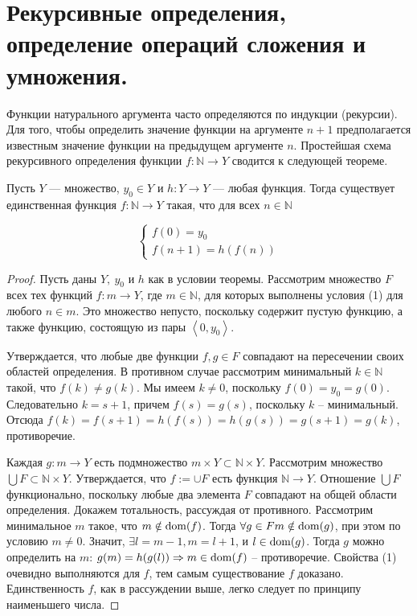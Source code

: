 \section{Рекурсивные определения, определение операций сложения и умножения.}

Функции натурального аргумента часто определяются по индукции (рекурсии). Для того, чтобы определить значение
функции на аргументе $n+1$ предполагается известным значение функции на предыдущем аргументе $n$. Простейшая схема
рекурсивного определения функции $f: \mathbb{N} \rightarrow Y$ сводится к следующей теореме. 

\begin{theorem}
	Пусть $Y$ — множество, $y_{0} \in Y$ и $h: Y \rightarrow Y$ — любая
	функция. Тогда существует единственная функция $f: \mathbb{N} \rightarrow Y$ такая,
	что для всех $n \in \mathbb{N}$

	\begin{equation}
		\left\{\begin{array}{l}
			{f(0)=y_{0}} \\
			{f(n+1)=h(f(n))}
		\end{array}\right.
	\end{equation}

\end{theorem}

\begin{proof}

	Пусть даны $Y, \ y_0$ и $h$ как в условии теоремы. Рассмотрим множество $F$ всех тех функций $f: m \rightarrow Y$,
	где $m \in \mathbb{N}$, для которых выполнены условия (1) для любого $n \in m$. Это множество непусто,
	поскольку содержит пустую функцию, а также функцию, состоящую из
	пары $\left\langle 0, y_{0}\right\rangle$.

	Утверждается, что любые две функции $f, g \in F$ совпадают на пересечении своих областей определения. В противном
	случае рассмотрим минимальный $k \in \mathbb{N}$ такой, что $f(k) \neq g(k)$. Мы имеем $k \neq 0$, поскольку
	$f(0)=y_{0}=g(0)$. Следовательно $k=s+1$, причем $f(s) = g(s)$, поскольку $k$ -- минимальный. Отсюда
	$f(k)=f(s+1)=h(f(s))=h(g(s))=g(s+1)=g(k)$, противоречие.

	Каждая $g: m \rightarrow Y$ есть подмножество $m \times Y \subset \mathbb{N} \times Y$. Рассмотрим множество
	$\bigcup F \subset \mathbb{N} \times Y$. Утверждается, что $f:=\cup F$ есть функция $\mathbb{N} \rightarrow Y$.
	Отношение $\bigcup F$ функционально, поскольку любые два элемента $F$ совпадают на общей области определения.
	Докажем тотальность, рассуждая от противного. Рассмотрим минимальное $m$ такое, что
	$m \notin \operatorname{dom}(f)$. Тогда $\forall g\in F m\notin\operatorname{dom}(g)$, при этом по условию $m\ne 0$. Значит, $\exists l=m-1,
	m=l+1$, и $l\in\operatorname{dom}(g)$. Тогда $g$ можно определить на $m$: $g(m)=h(g(l))\Rightarrow m\in\operatorname{dom}(f)$ --
	противоречие. Свойства (1) очевидно выполняются для $f$, тем самым существование $f$ доказано.
	Единственность $f$, как в рассуждении выше, легко следует по принципу наименьшего числа.
\end{proof}


